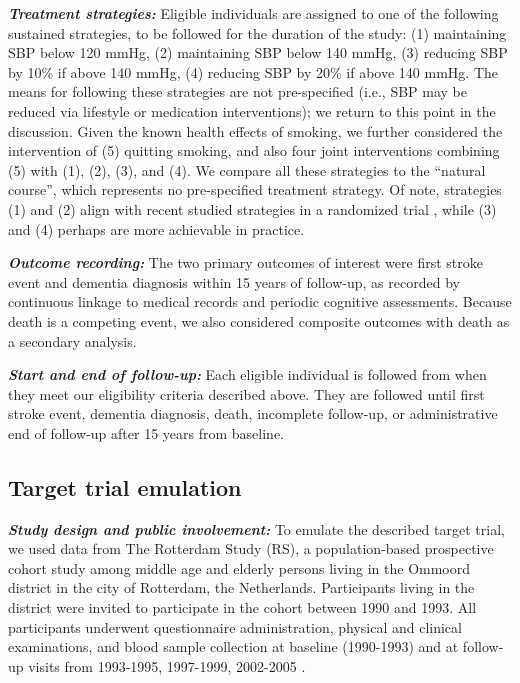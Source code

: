 \documentclass[
]{book}
\begin{document}
\textbf{\emph{Treatment strategies:}} Eligible individuals are assigned to one of the following sustained strategies, to be followed for the duration of the study: (1) maintaining SBP below 120 mmHg, (2) maintaining SBP below 140 mmHg, (3) reducing SBP by 10\% if above 140 mmHg, (4) reducing SBP by 20\% if above 140 mmHg. The means for following these strategies are not pre-specified (i.e., SBP may be reduced via lifestyle or medication interventions); we return to this point in the discussion. Given the known health effects of smoking, we further considered the intervention of (5) quitting smoking, and also four joint interventions combining (5) with (1), (2), (3), and (4). We compare all these strategies to the ``natural course'', which represents no pre-specified treatment strategy. Of note, strategies (1) and (2) align with recent studied strategies in a randomized trial \autocite{williamson2019}, while (3) and (4) perhaps are more achievable in practice.

\textbf{\emph{Outcome recording:}} The two primary outcomes of interest were first stroke event and dementia diagnosis within 15 years of follow-up, as recorded by continuous linkage to medical records and periodic cognitive assessments. Because death is a competing event, we also considered composite outcomes with death as a secondary analysis.

\textbf{\emph{Start and end of follow-up:}} Each eligible individual is followed from when they meet our eligibility criteria described above. They are followed until first stroke event, dementia diagnosis, death, incomplete follow-up, or administrative end of follow-up after 15 years from baseline.

\hypertarget{target-trial-emulation}{%
\subsection{Target trial emulation}\label{target-trial-emulation}}

\textbf{\emph{Study design and public involvement:}} To emulate the described target trial, we used data from The Rotterdam Study (RS), a population-based prospective cohort study among middle age and elderly persons living in the Ommoord district in the city of Rotterdam, the Netherlands. Participants living in the district were invited to participate in the cohort between 1990 and 1993. All participants underwent questionnaire administration, physical and clinical examinations, and blood sample collection at baseline (1990-1993) and at follow-up visits from 1993-1995, 1997-1999, 2002-2005 \autocite{ikram2017}.
\end{document}
